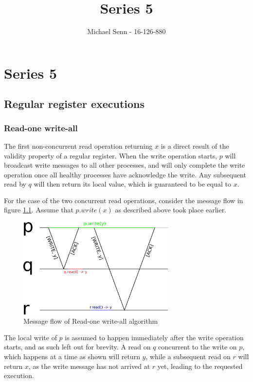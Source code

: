 \documentclass[a4paper]{scrreprt}
\title{Series 5}
\author{Michael Senn \maillink{michael.senn@students.unibe.ch} - 16-126-880}
\date{\printdate}
\begin{document}
\maketitle


\setcounter{chapter}{4}

\chapter{Series 5}

\section{Regular register executions}

\subsection{Read-one write-all}

The first non-concurrent read operation returning $x$ is a direct result of the
validity property of a regular register. When the write operation starts, $p$
will broadcast write messages to all other processes, and will only complete
the write operation once all healthy processes have acknowledge the write. Any
subsequent read by $q$ will then return its local value, which is guaranteed to
be equal to $x$.

For the case of the two concurrent read operations, consider the message
flow in figure \ref{fig:read_one_write_all}. Assume that $p.write(x)$ as
described above took place earlier.

\begin{figure}[h]
    \centering
    \includegraphics[width=0.7\textwidth]{res/5_1_a.png}
    \caption{Message flow of Read-one write-all algorithm}
    \label{fig:read_one_write_all}
\end{figure}

The local write of $p$ is assumed to happen immediately after the write
operation starts, and as such left out for brevity. A read on $q$ concurrent to
the write on $p$, which happens at a time as shown will return $y$, while a
subsequent read on $r$ will return $x$, as the write message has not arrived at
$r$ yet, leading to the requested execution.
\end{document}
